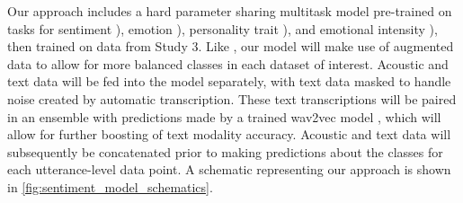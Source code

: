 Our approach includes a hard parameter sharing multitask model pre-trained on
tasks for sentiment \citep{Zadeh.ea:2016}), emotion \citep{Poria.ea:2019}),
personality trait \citep{Ponce-Lopez.ea:2016}),
and emotional intensity \citep{Livingstone.ea:2018}), then trained on data from
Study 3. Like \citet{Liu.ea:2021}, our model will make use of augmented data to
allow for more balanced classes in each dataset of interest.  Acoustic and text
data will be fed into the model separately, with text data masked to handle
noise created by automatic transcription. These text transcriptions will be
paired in an ensemble with predictions made by a trained wav2vec model
\citep{Schneider.ea:2019}, which will allow for further boosting of text
modality accuracy. Acoustic and text data will subsequently be concatenated
prior to making predictions about the classes for each utterance-level data
point. A schematic representing our approach is shown in
\autoref{fig:sentiment_model_schematics}.

